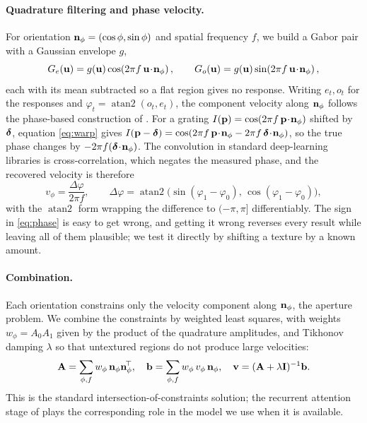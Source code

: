 \paragraph{Quadrature filtering and phase velocity.} For orientation
$\mathbf{n}_\phi=(\cos\phi,\sin\phi)$ and spatial frequency $f$, we build a Gabor pair
with a Gaussian envelope $g$,
\begin{equation}
G_e(\mathbf{u})=g(\mathbf{u})\cos\!\left(2\pi f\,\mathbf{u}\!\cdot\!\mathbf{n}_\phi\right),
\qquad
G_o(\mathbf{u})=g(\mathbf{u})\sin\!\left(2\pi f\,\mathbf{u}\!\cdot\!\mathbf{n}_\phi\right),
\label{eq:gabor}
\end{equation}
each with its mean subtracted so a flat region gives no response. Writing
$e_t,o_t$ for the responses and $\varphi_t=\operatorname{atan2}(o_t,e_t)$, the
component velocity along $\mathbf{n}_\phi$ follows the phase-based construction of
\citet{fleet1990phase}. For a grating $I(\mathbf{p})=\cos(2\pi f\,\mathbf{p}\!\cdot\!\mathbf{n}_\phi)$
shifted by $\boldsymbol{\delta}$, equation \eqref{eq:warp} gives
$I(\mathbf{p}-\boldsymbol{\delta})=\cos(2\pi f\,\mathbf{p}\!\cdot\!\mathbf{n}_\phi-2\pi f\,\boldsymbol{\delta}\!\cdot\!\mathbf{n}_\phi)$,
so the true phase changes by $-2\pi f(\boldsymbol{\delta}\!\cdot\!\mathbf{n}_\phi)$. The convolution in
standard deep-learning libraries is cross-correlation, which negates the
measured phase, and the recovered velocity is therefore
\begin{equation}
v_\phi=\frac{\Delta\varphi}{2\pi f},
\qquad
\Delta\varphi=\operatorname{atan2}\bigl(\sin(\varphi_1-\varphi_0),\,
                                        \cos(\varphi_1-\varphi_0)\bigr),
\label{eq:phase}
\end{equation}
with the $\operatorname{atan2}$ form wrapping the difference to $(-\pi,\pi]$
differentiably. The sign in \eqref{eq:phase} is easy to get wrong, and getting
it wrong reverses every result while leaving all of them plausible; we test it
directly by shifting a texture by a known amount.

\paragraph{Combination.} Each orientation constrains only the velocity
component along $\mathbf{n}_\phi$, the aperture problem. We combine the constraints by
weighted least squares, with weights $w_\phi=A_0A_1$ given by the product of
the quadrature amplitudes, and Tikhonov damping $\lambda$ so that untextured
regions do not produce large velocities:
\begin{equation}
\mathbf{A}=\sum_{\phi,f}w_\phi\,\mathbf{n}_\phi\mathbf{n}_\phi^{\!\top},
\quad
\mathbf{b}=\sum_{\phi,f}w_\phi\,v_\phi\,\mathbf{n}_\phi,
\quad
\mathbf{v}=(\mathbf{A}+\lambda\mathbf I)^{-1}\mathbf{b} .
\label{eq:lstsq}
\end{equation}
This is the standard intersection-of-constraints solution; the recurrent
attention stage of \citet{sun2025multiorder} plays the corresponding role in
the model we use when it is available.

